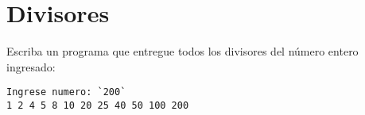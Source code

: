 \section{Divisores}

Escriba un programa que entregue todos los divisores del número entero
ingresado:

\begin{lstlisting}[language=testcase]
Ingrese numero: `200`
1 2 4 5 8 10 20 25 40 50 100 200
\end{lstlisting}
